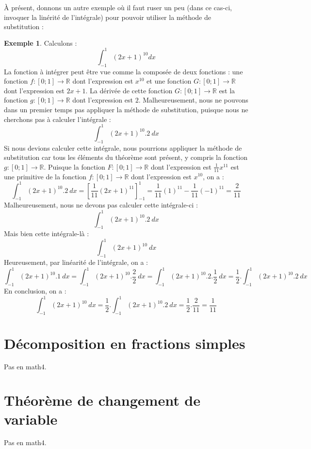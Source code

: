 \documentclass[a4paper,fontsize=13pt]{scrreprt}
\theoremstyle{plain}
\theoremstyle{definition}
\newtheorem{exe}[subsection]{Exemple}
\newcommand{\rr}{\mathbb{R}}
\begin{document}
À présent, donnons un autre exemple où il faut ruser un peu (dans ce cas-ci, invoquer la linérité de l'intégrale) pour pouvoir utiliser la méthode de substitution :
\begin{exe}
Calculons :
$$\int_{-1}^{1} (2x+1)^{10} dx$$
La fonction à intégrer peut être vue comme la composée de deux fonctions : une fonction $f : [0;1] \to \rr$ dont l'expression est $x^{10}$ et une fonction $G : [0;1] \to \rr$ dont l'expression est $2x+1$. La dérivée de cette fonction $G : [0;1] \to \rr$ est la fonction $g : [0;1] \to \rr$ dont l'expression est $2$. Malheureusement, nous ne pouvons dans un premier temps pas appliquer la méthode de substitution, puisque nous ne cherchons pas à calculer l'intégrale :
$$\int_{-1}^{1} (2x+1)^{10} . 2~dx$$
Si nous devions calculer cette intégrale, nous pourrions appliquer la méthode de substitution car tous les éléments du théorème sont présent, y compris la fonction $g : [0;1] \to \rr$. Puisque la fonction $F : [0;1] \to \rr$ dont l'expression est $\frac{1}{11}x^{11}$ est une primitive de la fonction $f : [0;1] \to \rr$ dont l'expression est $x^{10}$, on a :
$$\int_{-1}^{1} (2x+1)^{10} . 2~dx = [\frac{1}{11}(2x+1)^{11}]_{-1}^{1} = \frac{1}{11}(1)^{11} - \frac{1}{11}(-1)^{11} = \frac{2}{11}$$
Malheureusement, nous ne devons pas calculer cette intégrale-ci :
$$\int_{-1}^{1} (2x+1)^{10} . 2~dx$$
Mais bien cette intégrale-là :
$$\int_{-1}^{1} (2x+1)^{10}~dx$$
Heureusement, par linéarité de l'intégrale, on a :
$$\int_{-1}^{1} (2x+1)^{10}.1~dx = \int_{-1}^{1} (2x+1)^{10}.\frac{2}{2}~dx = \int_{-1}^{1} (2x+1)^{10}.2.\frac{1}{2}~dx = \frac{1}{2}.\int_{-1}^{1} (2x+1)^{10}.2 ~dx$$
En conclusion, on a :
$$\int_{-1}^{1} (2x+1)^{10}~dx = \frac{1}{2}.\int_{-1}^{1} (2x+1)^{10}.2~dx = \frac{1}{2}.\frac{2}{11} = \frac{1}{11}$$
\end{exe}
\section{Décomposition en fractions simples}
Pas en math4.
\section{Théorème de changement de variable}
Pas en math4.
\end{document}
